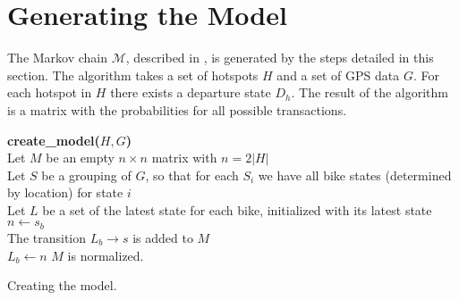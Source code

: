\section{Generating the Model}\label{sec:generatemarkov}
The Markov chain $\mathcal{M}$, described in , is generated by the steps detailed in this section.
The algorithm takes a set of hotspots $H$ and a set of GPS data $G$. For each hotspot in $H$ there exists a departure state $D_h$.
The result of the algorithm is a matrix with the probabilities for all possible transactions.

\begin{algorithm}[H]
\textbf{create\_model($H, G$)} \\
Let $M$ be an empty $n \times n$ matrix with $n = 2|H|$ \\
Let $S$ be a grouping of $G$, so that for each $S_i$ we have all bike states (determined by location) for state $i$\\
Let $L$ be a set of the latest state for each bike, initialized with its latest state\\
  {
    {$n \leftarrow s_b$\\
    The transition $L_b \rightarrow s$ is added to $M$\\
     $L_b \leftarrow n$}}
$M$ is normalized.\\
\caption{Creating the model.}
\label{markov:create_model}
\end{algorithm}